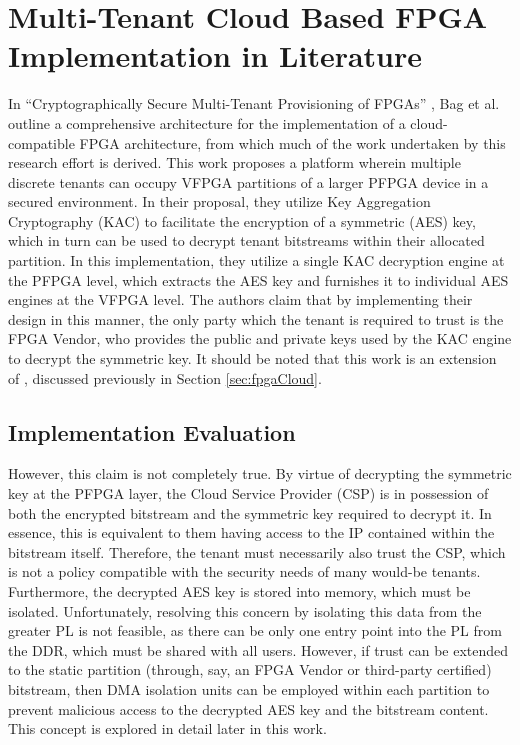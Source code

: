 \section{Multi-Tenant Cloud Based FPGA Implementation in Literature}\label{sec:LitImpl}
In ``Cryptographically Secure Multi-Tenant Provisioning of FPGAs'' \cite{bag_cryptographically_2020}, Bag et al. outline a comprehensive architecture for the implementation of a cloud-compatible FPGA architecture, from which much of the work undertaken by this research effort is derived. This work proposes a platform wherein multiple discrete tenants can occupy VFPGA partitions of a larger PFPGA device in a secured environment. In their proposal, they utilize Key Aggregation Cryptography (KAC) to facilitate the encryption of a symmetric (AES) key, which in turn can be used to decrypt tenant bitstreams within their allocated partition. In this implementation, they utilize a single KAC decryption engine at the PFPGA level, which extracts the AES key and furnishes it to individual AES engines at the VFPGA level. The authors claim that by implementing their design in this manner, the only party which the tenant is required to trust is the FPGA Vendor, who provides the public and private keys used by the KAC engine to decrypt the symmetric key. It should be noted that this work is an extension of \cite{chen_enabling_2014}, discussed previously in Section \ref{sec:fpgaCloud}.


\subsection{Implementation Evaluation}\label{subsec:LitEval}
However, this claim is not completely true. By virtue of decrypting the symmetric key at the PFPGA layer, the Cloud Service Provider (CSP) is in possession of both the encrypted bitstream and the symmetric key required to decrypt it. In essence, this is equivalent to them having access to the IP contained within the bitstream itself. Therefore, the tenant must necessarily also trust the CSP, which is not a policy compatible with the security needs of many would-be tenants. Furthermore, the decrypted AES key is stored into memory, which must be isolated. Unfortunately, resolving this concern by isolating this data from the greater PL is not feasible, as there can be only one entry point into the PL from the DDR, which must be shared with all users. However, if trust can be extended to the static partition (through, say, an FPGA Vendor or third-party certified) bitstream, then DMA isolation units can be employed within each partition to prevent malicious access to the decrypted AES key and the bitstream content. This concept is explored in detail later in this work.

